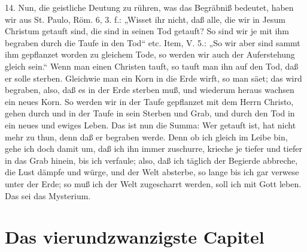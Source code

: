 14. Nun, die geistliche Deutung zu rühren, was das Begräbniß bedeutet, haben wir aus St. Paulo, Röm. 6, 3. f.: „Wisset ihr nicht, daß alle, die wir in Jesum Christum getauft sind, die sind in seinen Tod getauft? So sind wir je mit ihm begraben durch die Taufe in den Tod“ etc. Item, V. 5.: „So wir aber sind sammt ihm gepflanzet worden zu gleichem Tode, so werden wir auch der Auferstehung gleich sein.“ Wenn man einen Christen tauft, so tauft man ihn auf den Tod, daß er solle sterben. Gleichwie man ein Korn in die Erde wirft, so man säet; das wird begraben, also, daß es in der Erde sterben muß, und wiederum heraus wachsen ein neues Korn. So werden wir in der Taufe gepflanzet mit dem Herrn Christo, gehen durch und in der Taufe in sein Sterben und Grab, und durch den Tod in ein neues und ewiges Leben. Das ist nun die Summa: Wer getauft ist, hat nicht mehr zu thun, denn daß er begraben werde. Denn ob ich gleich im Leibe bin, gehe ich doch damit um, daß ich ihn immer zuschurre, krieche je tiefer und tiefer in das Grab hinein, bis ich verfaule; also, daß ich täglich der Begierde abbreche, die Lust dämpfe und würge, und der Welt absterbe, so lange bis ich gar verwese unter der Erde; so muß ich der Welt zugescharrt werden, soll ich mit Gott leben. Das sei das Mysterium.

\section{Das vierundzwanzigste Capitel}

